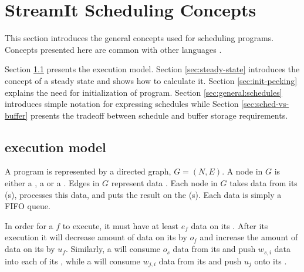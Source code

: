 \section{StreamIt Scheduling Concepts}
\label{chpt:sched-basic}

This section introduces the general concepts used for scheduling
{\StreamIt} programs.  Concepts presented here are common with other
languages \cite{ptolemyoverview} \cite{esterel92} \cite{lustre}.

Section \ref{sec:exec-model} presents the {\StreamIt} execution
model. Section \ref{sec:steady-state} introduces the concept of a
steady state and shows how to calculate it. Section
\ref{sec:init-peeking} explains the need for initialization of
{\StreamIt} program. Section \ref{sec:general:schedules} introduces
simple notation for expressing schedules while Section
\ref{sec:sched-vs-buffer} presents the tradeoff between schedule
and buffer storage requirements.

\subsection{{\StreamIt} execution model}
\label{sec:exec-model}

A {\StreamIt} program is represented by a directed graph, $G = (N,
E)$.  A node in $G$ is either a {\filter}, a {\splitter} or a
{\joiner}. Edges in $G$ represent data {\Channels}.  Each node in
$G$ takes data from its {\Input} {\Channel}(s), processes this data,
and puts the result on the {\Output} {\Channel}(s).  Each data
{\Channel} is simply a FIFO queue.

In order for a {\filter} $f$ to execute, it must have at least $e_f$
data on its {\Input} {\Channel}. After its execution it will decrease
amount of data on its {\Input} {\Channel} by $o_f$ and increase the
amount of data on its {\Output} {\Channel} by $u_f$. Similarly, a
{\splitter} will consume $o_s$ data from its {\Input} {\Channel} and
push $w_{s,i}$ data into each of its {\Output} {\Channels}, while a
{\joiner} will consume $w_{j,i}$ data from its {\Input} {\Channels} and
push $u_j$ onto its {\Output} {\Channel}.

